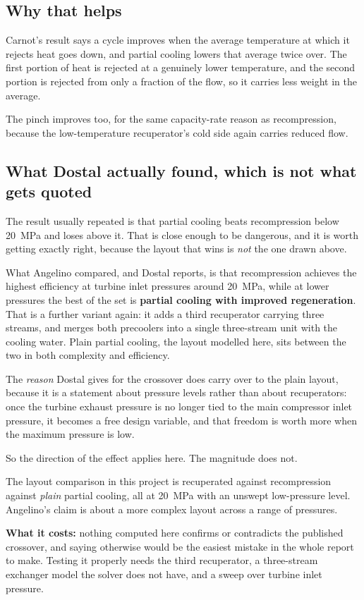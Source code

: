 \documentclass[11pt,a4paper]{report}
\begin{document}
\subsection{Why that helps}

Carnot's result says a cycle improves when the average temperature at which
it rejects heat goes down, and partial cooling lowers that average twice
over. The first portion of heat is rejected at a genuinely lower
temperature, and the second portion is rejected from only a fraction of the
flow, so it carries less weight in the average.

The pinch improves too, for the same capacity-rate reason as recompression,
because the low-temperature recuperator's cold side again carries reduced
flow.

\subsection{What Dostal actually found, which is not what gets quoted}
\label{sec:dostal}

The result usually repeated is that partial cooling beats recompression
below \SI{20}{\mega\pascal} and loses above it. That is close enough to be
dangerous, and it is worth getting exactly right, because the layout that
wins is \emph{not} the one drawn above.

What Angelino compared, and Dostal reports, is that recompression achieves
the highest efficiency at turbine inlet pressures around
\SI{20}{\mega\pascal}, while at lower pressures the best of the set is
\textbf{partial cooling with improved regeneration}. That is a further
variant again: it adds a third recuperator carrying three streams, and
merges both precoolers into a single three-stream unit with the cooling
water. Plain partial cooling, the layout modelled here, sits between the two
in both complexity and efficiency.

The \emph{reason} Dostal gives for the crossover does carry over to the
plain layout, because it is a statement about pressure levels rather than
about recuperators: once the turbine exhaust pressure is no longer tied to
the main compressor inlet pressure, it becomes a free design variable, and
that freedom is worth more when the maximum pressure is low.

So the direction of the effect applies here. The magnitude does not.

\begin{caveat}[title={Caveat: the measured comparison does not test Angelino's crossover}]
The layout comparison in this project is recuperated against recompression
against \emph{plain} partial cooling, all at \SI{20}{\mega\pascal} with an
unswept low-pressure level. Angelino's claim is about a more complex layout
across a range of pressures.

\textbf{What it costs:} nothing computed here confirms or contradicts the
published crossover, and saying otherwise would be the easiest mistake in
the whole report to make. Testing it properly needs the third recuperator,
a three-stream exchanger model the solver does not have, and a sweep over
turbine inlet pressure.
\end{caveat}
\end{document}
